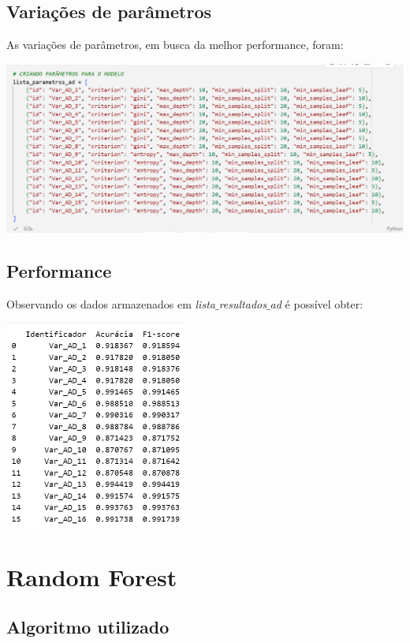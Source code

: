 \documentclass[12pt,a4paper]{article}
\begin{document}
\vspace{0.5cm}
\subsection{Variações de parâmetros}

\quad\space As variações de parâmetros, em busca da melhor performance, foram:

\begin{center}
	\includegraphics[width=\textwidth]{imagem/adp.png}
\end{center}

\subsection{Performance}

\quad\space Observando os dados armazenados em \textit{lista$\_$resultados$\_$ad} é possível obter:

\begin{center}
	\includegraphics[width=6cm]{imagem/adr.png}
\end{center}

\newpage
\section{Random Forest}
\subsection{Algoritmo utilizado}
\end{document}
